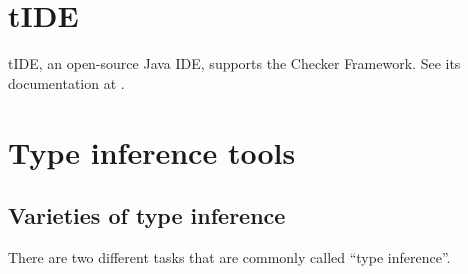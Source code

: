 \section{tIDE\label{tide}}

tIDE, an open-source Java IDE, supports the Checker Framework.  See its
documentation at .


\section{Type inference tools\label{type-inference-tools}}

\subsection{Varieties of type inference}

There are two different tasks that are commonly called ``type inference''.

